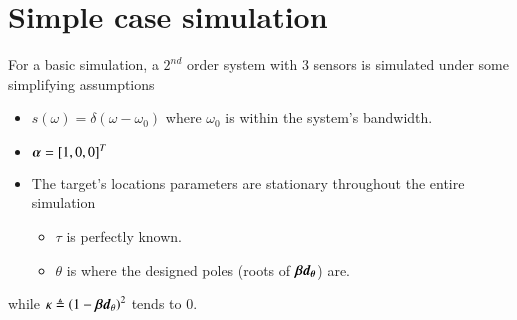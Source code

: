 \section{Simple case simulation}
For a basic simulation, a $ 2^{nd} $ order system with $3$ sensors is simulated under some simplifying assumptions
\begin{itemize}
    \item $s\left(\omega\right) = \delta\left(\omega-\omega_{0}\right)$ where $\omega_{0}$ is within the system's bandwidth.
    \item $\boldsymbol{\alpha} = \left[1,0,0\right]^{T}$
    \item The target's locations parameters are stationary throughout the entire simulation
    \begin{itemize}
        \item $\tau$ is perfectly known.
        \item $\theta$ is where the designed poles (roots of $\boldsymbol{\beta}\boldsymbol{d_{\theta}}$) are.
    \end{itemize} 
\end{itemize}
while $\kappa \triangleq \left(1-\boldsymbol{\beta}\boldsymbol{d}_{\theta}\right)^{2}$ tends to $0$.
